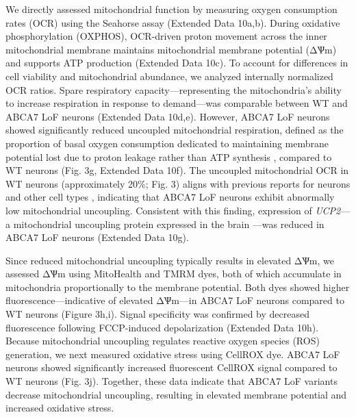 We directly assessed mitochondrial function by measuring oxygen consumption rates (OCR) using the Seahorse assay (Extended Data 10a,b). During oxidative phosphorylation (OXPHOS), OCR-driven proton movement across the inner mitochondrial membrane maintains mitochondrial membrane potential (ΔѰm) and supports ATP production (Extended Data 10c). To account for differences in cell viability and mitochondrial abundance, we analyzed internally normalized OCR ratios. Spare respiratory capacity—representing the mitochondria's ability to increase respiration in response to demand—was comparable between WT and ABCA7 LoF neurons (Extended Data 10d,e). However, ABCA7 LoF neurons showed significantly reduced uncoupled mitochondrial respiration, defined as the proportion of basal oxygen consumption dedicated to maintaining membrane potential lost due to proton leakage rather than ATP synthesis \supercite{Divakaruni2022-bp}, compared to WT neurons (Fig. 3g, Extended Data 10f). The uncoupled mitochondrial OCR in WT neurons (approximately 20\%; Fig. 3) aligns with previous reports for neurons and other cell types \supercite{Divakaruni2011-uj,Jekabsons2004-fn,Jain2024-br}, indicating that ABCA7 LoF neurons exhibit abnormally low mitochondrial uncoupling. Consistent with this finding, expression of \textit{UCP2}—a mitochondrial uncoupling protein expressed in the brain \supercite{Kumar2022-bb}—was reduced in ABCA7 LoF neurons (Extended Data 10g).

Since reduced mitochondrial uncoupling typically results in elevated ΔѰm, we assessed ΔѰm using MitoHealth and TMRM dyes, both of which accumulate in mitochondria proportionally to the membrane potential. Both dyes showed higher fluorescence—indicative of elevated ΔѰm—in ABCA7 LoF neurons compared to WT neurons (Figure 3h,i). Signal specificity was confirmed by decreased fluorescence following FCCP-induced depolarization (Extended Data 10h). Because mitochondrial uncoupling regulates reactive oxygen species (ROS) generation, we next measured oxidative stress using CellROX dye. ABCA7 LoF neurons showed significantly increased fluorescent CellROX signal compared to WT neurons (Fig. 3j). Together, these data indicate that ABCA7 LoF variants decrease mitochondrial uncoupling, resulting in elevated membrane potential and increased oxidative stress.

